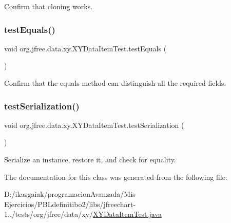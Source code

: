 Confirm that cloning works. \mbox{\label{classorg_1_1jfree_1_1data_1_1xy_1_1_x_y_data_item_test_a8bd65db4f4e294074c48782f48483d9a}} 
\subsubsection{\texorpdfstring{test\+Equals()}{testEquals()}}
{\footnotesize\ttfamily void org.\+jfree.\+data.\+xy.\+X\+Y\+Data\+Item\+Test.\+test\+Equals (\begin{DoxyParamCaption}{ }\end{DoxyParamCaption})}

Confirm that the equals method can distinguish all the required fields. \mbox{\label{classorg_1_1jfree_1_1data_1_1xy_1_1_x_y_data_item_test_ae57b1a9296929de01f1cab5d73e33a36}} 
\subsubsection{\texorpdfstring{test\+Serialization()}{testSerialization()}}
{\footnotesize\ttfamily void org.\+jfree.\+data.\+xy.\+X\+Y\+Data\+Item\+Test.\+test\+Serialization (\begin{DoxyParamCaption}{ }\end{DoxyParamCaption})}

Serialize an instance, restore it, and check for equality. 

The documentation for this class was generated from the following file\+:\begin{DoxyCompactItemize}
\item 
D\+:/ikasgaiak/programacion\+Avanzada/\+Mis Ejercicios/\+P\+B\+Ldefinitibo2/libs/jfreechart-\/1../tests/org/jfree/data/xy/\mbox{\hyperlink{_x_y_data_item_test_8java}{X\+Y\+Data\+Item\+Test.\+java}}\end{DoxyCompactItemize}
